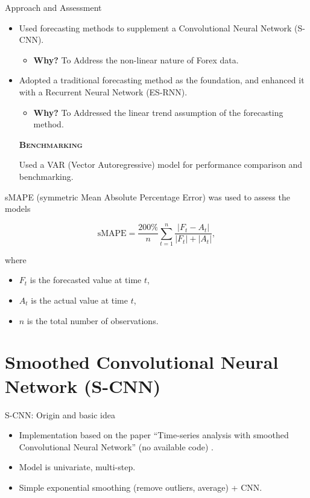\documentclass[aspectratio=169, 12pt]{beamer}
\begin{document}
\begin{frame}[allowframebreaks]{Approach and Assessment}

\begin{itemize}
        \item Used forecasting methods to supplement a Convolutional Neural Network (S-CNN).
        \begin{itemize}
            \item \textbf{Why?} To Address the non-linear nature of Forex data.
        \end{itemize}
        \item Adopted a traditional forecasting method as the foundation, and enhanced it with a Recurrent Neural Network (ES-RNN).
        \begin{itemize}
            \item \textbf{Why?} To Addressed the linear trend assumption of the forecasting method\cite{ayitey}.
        \end{itemize}

\begin{center}
    \textsc{\textbf{Benchmarking}}
\end{center}
        
Used a VAR (Vector Autoregressive) model for performance comparison and benchmarking.
\end{itemize}

sMAPE (symmetric Mean Absolute Percentage Error) was used to assess the models

\[
\text{sMAPE} = \frac{200\%}{n} \sum_{t=1}^n \frac{|F_t - A_t|}{|F_t| + |A_t|},
\]

where 
\begin{itemize}
    \item $F_t$ is the forecasted value at time $t$,
    \item $A_t$ is the actual value at time $t$,
    \item $n$ is the total number of observations.
\end{itemize}

\end{frame}

\section{Smoothed Convolutional Neural Network (S-CNN)}

\begin{frame}{S-CNN: Origin and basic idea}
    \begin{itemize}
        \item Implementation based on the paper ``Time-series analysis with smoothed Convolutional Neural Network''\cite{e-cnn} (no available code) .
        \item Model is univariate, multi-step.
        \item Simple exponential smoothing (remove outliers, average) + CNN.
    \end{itemize}
\end{frame}
\end{document}
